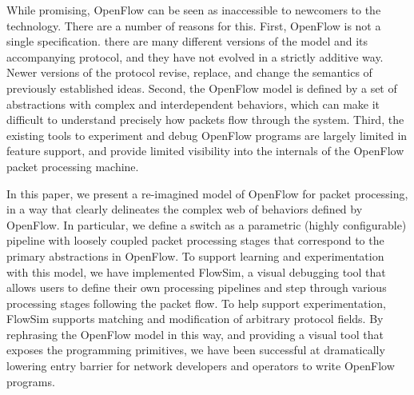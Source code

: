 While promising, OpenFlow can be seen as inaccessible to newcomers to the 
technology. There are a number of reasons for this. First, OpenFlow is not a 
single specification. there are many different versions of the model and its 
accompanying protocol, and they have not evolved in a strictly additive way. 
Newer versions of the protocol revise, replace, and change the semantics of 
previously established ideas. Second, the OpenFlow model is defined by a set of 
abstractions with complex and interdependent behaviors, which can make it 
difficult to understand precisely how packets flow through the system.
Third, the existing tools to experiment and debug OpenFlow programs are 
largely limited in feature support, and provide limited visibility into the 
internals of the OpenFlow packet processing machine.

In this paper, we present a re-imagined model of OpenFlow for
packet processing, in a way that clearly delineates the complex web of behaviors
defined by OpenFlow. In particular, we define a switch as a parametric (highly 
configurable) pipeline with loosely coupled packet processing stages that 
correspond to the primary abstractions in OpenFlow. To support learning and 
experimentation with this model, we have implemented FlowSim, a visual debugging
tool that allows users to define their own processing pipelines and step through
various processing stages following the packet flow. To help support 
experimentation, FlowSim supports matching and modification of arbitrary 
protocol fields. By rephrasing the OpenFlow model in this way, and providing a 
visual tool that exposes the programming primitives, we have been successful
at dramatically lowering entry barrier for network developers and operators to 
write OpenFlow programs.


